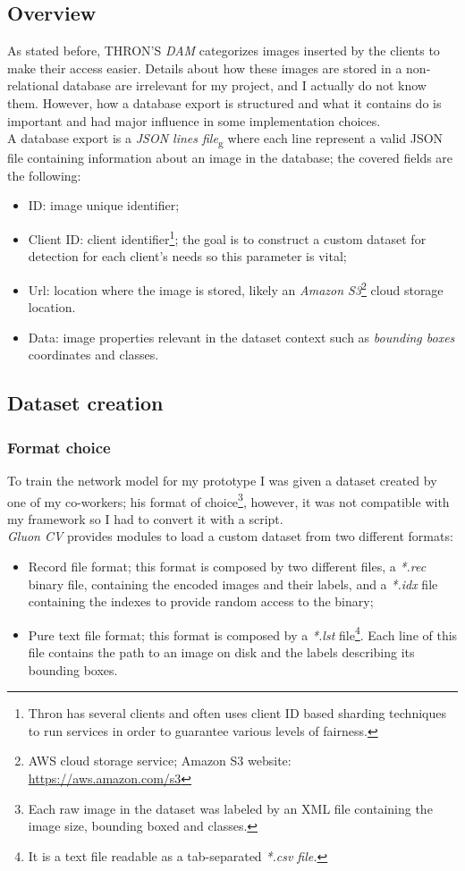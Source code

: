 \subsection{Overview}
As stated before, THRON'S \emph{DAM} categorizes images inserted by the clients to make their access easier. Details about how these images are stored in a non-relational database are irrelevant for my project, and I actually do not know them. However, how a database export is structured and what it contains do is important and had major influence in some implementation choices. \\
A database export is a  \emph{\gls{JSON lines file}}\textsubscript{g} where each line represent a valid JSON file containing information about an image in the database; the covered fields are the following:
\begin{itemize}
	\item ID: image unique identifier;
	\item Client ID: client identifier\footnote{Thron has several clients and often uses client ID based sharding techniques to run services in order to guarantee various levels of fairness.}; the goal is to construct a custom dataset for detection for each client's needs so this parameter is vital;
	\item Url: location where the image is stored, likely an \emph{Amazon S3}\footnote{AWS cloud storage service; Amazon S3 website: \url{https://aws.amazon.com/s3}} cloud storage location.
	\item Data: image properties relevant in the dataset context such as \emph{bounding boxes} coordinates and classes.
\end{itemize}


\subsection{Dataset creation}

\subsubsection{Format choice}
To train the network model for my prototype I was given a dataset created by one of my co-workers; his format of choice\footnote{Each raw image in the dataset was labeled by an XML file containing the image size, bounding boxed and classes.}, however, it was not compatible with my framework so I had to convert it with a script. \\
\emph{Gluon CV} provides modules to load a custom dataset from two different formats:
\begin{itemize}
	\item Record file format; this format is composed by two different files, a \emph{*.rec} binary file, containing the encoded images and their labels, and a \emph{*.idx} file containing the indexes to provide random access to the binary;
	\item Pure text file format; this format is composed by a \emph{*.lst} file\footnote{It is a text file readable as a tab-separated \emph{*.csv file.}}. Each line of this file contains the path to an image on disk and the labels describing its bounding boxes.
\end{itemize}


